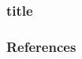 \documentclass[xcolor=dvipsnames,aspectratio=1610,handout]{beamer}
\begin{document}
\begin{frame}
  \frametitle{title}
  \cite{test}
\end{frame}

\begin{frame}
    \frametitle{References}
     
        
\end{frame}
\end{document}
